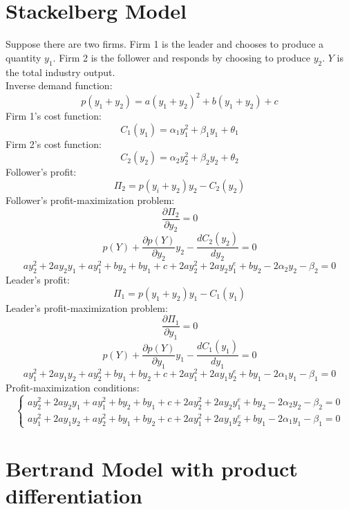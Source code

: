 \documentclass[11pt, a4paper]{article}
\begin{document}
\section{Stackelberg Model}

Suppose there are two firms. Firm 1 is the leader and chooses to produce a quantity $y_{1}$. Firm 2 is the follower and responds by choosing to produce $y_{2}$. $Y$ is the total industry output.\\
Inverse demand function:
\begin{equation*}
	p(y_{1} + y_{2}) = a(y_{1} + y_{2})^2 + b(y_{1} + y_{2})  + c
\end{equation*}
Firm 1's cost function:
\begin{equation*}
	C_{1}(y_{1}) = \alpha _{1}y_{1}^2 + \beta _{1}y_{1} + \theta _{1}
\end{equation*}
Firm 2's cost function:
\begin{equation*}
	C_{2}(y_{2}) = \alpha _{2}y_{2}^2 + \beta _{2}y_{2} + \theta _{2}
\end{equation*}
Follower's profit:
\begin{equation*}
	\Pi _{2} = p(y_{i} + y_{2})y_{2} - C_{2}(y_{2})
\end{equation*}
Follower's profit-maximization problem:
\begin{equation*}
	\frac{\partial\Pi_{2}}{\partial y_{2}} = 0
\end{equation*}
\begin{equation*}
	p(Y) + \frac{\partial p(Y)}{\partial y_{2}}y_{2} - \frac{dC_{2}(y_{2})}{dy_{2}} = 0
\end{equation*}
\begin{equation*}
	ay_{2}^2 + 2ay_{2}y_{1} + ay_{1}^2 + by_{2} + by_{1} + c + 2ay_{2}^2 + 2ay_{2}y_{1}^e + by_{2} - 2\alpha _{2}y_{2} - \beta _{2} = 0
\end{equation*}
Leader's profit:
\begin{equation*}
	\Pi _{1} = p(y_{1} + y_{2})y_{1} - C_{1}(y_{1})
\end{equation*}
Leader's profit-maximization problem:
\begin{equation*}
	\frac{\partial\Pi_{1}}{\partial y_{1}} = 0
\end{equation*}
\begin{equation*}
	p(Y) + \frac{\partial p(Y)}{\partial y_{1}}y_{1} - \frac{dC_{1}(y_{1})}{dy_{1}} = 0
\end{equation*}
\begin{equation*}
	ay_{1}^2 + 2ay_{1}y_{2} + ay_{2}^2 + by_{1} + by_{2} + c + 2ay_{1}^2 + 2ay_{1}y_{2}^e + by_{1} - 2\alpha _{1}y_{1} - \beta _{1} = 0
\end{equation*}
Profit-maximization conditions:
\begin{equation*}
	\begin{cases}
		ay_{2}^2 + 2ay_{2}y_{1} + ay_{1}^2 + by_{2} + by_{1} + c + 2ay_{2}^2 + 2ay_{2}y_{1}^e + by_{2} - 2\alpha _{2}y_{2} - \beta _{2} = 0 \\
		ay_{1}^2 + 2ay_{1}y_{2} + ay_{2}^2 + by_{1} + by_{2} + c + 2ay_{1}^2 + 2ay_{1}y_{2}^e + by_{1} - 2\alpha _{1}y_{1} - \beta _{1} = 0
	\end{cases}
\end{equation*}

\section{Bertrand Model with product differentiation}
\end{document}
